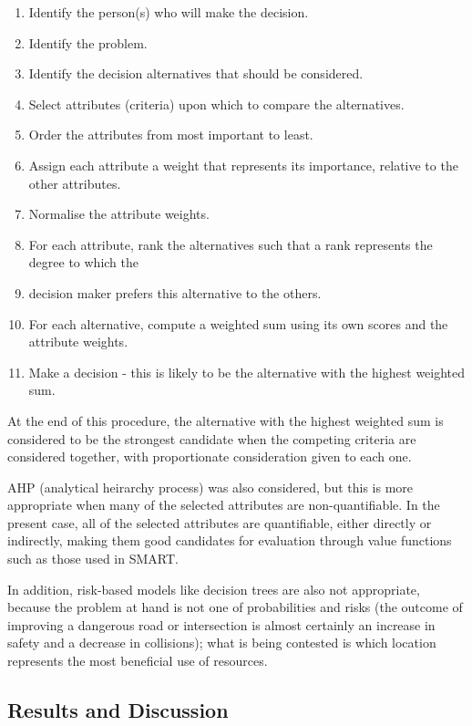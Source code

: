 \documentclass[11pt, a4paper]{article}
\begin{document}
    \begin{enumerate}
        \item Identify the person(s) who will make the decision.
        \item  Identify the problem.
        \item  Identify the decision alternatives that should be considered.
        \item  Select attributes (criteria) upon which to compare the alternatives.
        \item  Order the attributes from most important to least.
        \item  Assign each attribute a weight that represents its importance, relative to the other attributes.
        \item  Normalise the attribute weights.
        \item  For each attribute, rank the alternatives such that a rank represents the degree to which the \item  decision maker prefers this alternative to the others.
        \item  For each alternative, compute a weighted sum using its own scores and the attribute weights.
        \item  Make a decision - this is likely to be the alternative with the highest weighted sum.
    \end{enumerate}

    At the end of this procedure, the alternative with the highest weighted sum is considered to be the strongest candidate when the competing criteria are considered together, with proportionate consideration given to each one.

    AHP (analytical heirarchy process) was also considered, but this is more appropriate when many of the selected attributes are non-quantifiable. In the present case, all of the selected attributes are quantifiable, either directly or indirectly, making them good candidates for evaluation through value functions such as those used in SMART.

    In addition, risk-based models like decision trees are also not appropriate, because the problem at hand is not one of probabilities and risks (the outcome of improving a dangerous road or intersection is almost certainly an increase in safety and a decrease in collisions); what is being contested is which location represents the most beneficial use of resources.

    \subsection{Results and Discussion}
\end{document}
